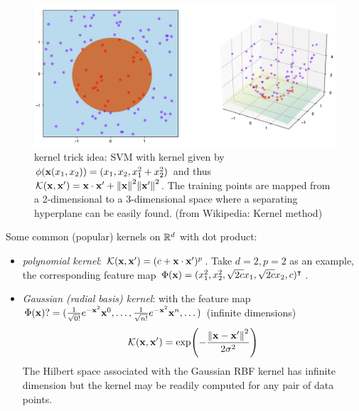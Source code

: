 \begin{figure}[!ht]
	\centering
	\includegraphics[width=0.6\linewidth]{Kernel_trick_idea.png}
	\caption{kernel trick idea: SVM with kernel given by $\phi(\vb{x}(x_1, x_2)) = (x_1, x_2, x_1^2 + x_2^2)$ and thus $\mathcal{K}(\vb{x},\vb{x}')=\vb{x}\cdot \vb{x}' + \norm{\vb{x}}^2 \norm{\vb{x}'}^2$. The training points are mapped from a 2-dimensional to a 3-dimensional space where a separating hyperplane can be easily found. (from Wikipedia: Kernel method)}
	\label{fig:kernel}
\end{figure}
Some common (popular) kernels on $\mathbb{R}^d$ with dot product:
\begin{itemize}
	\item \emph{polynomial kernel}:
	$\mathcal{K}(\vb{x},\vb{x}')=(c+\vb{x}\cdot \vb{x}')^p$.
	Take $d=2,p=2$ as an example, the corresponding feature map $\Phi(\vb{x})=(x_1^2,x_2^2,\sqrt{2c}x_1,\sqrt{2c}x_2,c)^\intercal$.

	\item \emph{Gaussian (radial basis) kernel}:
	with the feature map $\Phi(\vb{x})?=(\frac{1}{\sqrt{0!}}e^{-\vb{x}^2}\vb{x}^0,\dots,\frac{1}{\sqrt{n!}}e^{-\vb{x}^2}\vb{x}^n,\dots)$ (infinite dimensions)
	\begin{equation}
		\mathcal{K}(\vb{x},\vb{x}') = 
		\exp(-\frac{\norm{\vb{x}-\vb{x}'}^2}{2\sigma^2})
		\label{eq:gaussian_kernel}
	\end{equation}
	The Hilbert space associated with the Gaussian RBF kernel has infinite dimension but the kernel may be readily computed for any pair of data points.
\end{itemize}
